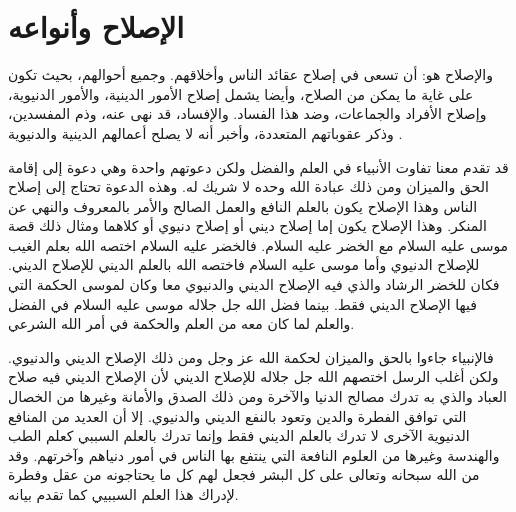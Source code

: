 

\section{الإصلاح وأنواعه}

والإصلاح هو: أن تسعى في إصلاح عقائد الناس وأخلاقهم. وجميع أحوالهم، بحيث تكون على غاية ما يمكن من الصلاح، وأيضا يشمل إصلاح الأمور الدينية، والأمور الدنيوية، وإصلاح الأفراد والجماعات، وضد هذا الفساد. والإفساد، قد نهى عنه، وذم المفسدين، وذكر عقوباتهم المتعددة، وأخبر أنه لا يصلح أعمالهم الدينية والدنيوية \href{https://shamela.ws/book/42/2142#p13}{\faExternalLink} \cite{tafsir_Saadi}.

قد تقدم معنا تفاوت الأنبياء في العلم والفضل ولكن دعوتهم واحدة وهي دعوة إلى إقامة الحق والميزان ومن ذلك عبادة الله وحده لا شريك له. وهذه الدعوة تحتاج إلى إصلاح الناس وهذا الإصلاح يكون بالعلم النافع والعمل الصالح والأمر بالمعروف والنهي عن المنكر. وهذا الإصلاح يكون إما إصلاح ديني أو إصلاح دنيوي أو كلاهما ومثال ذلك قصة موسى عليه السلام مع الخضر عليه السلام. فالخضر عليه السلام اختصه الله بعلم الغيب للإصلاح الدنيوي وأما موسى عليه السلام فاختصه الله بالعلم الديني للإصلاح الديني. فكان للخضر الرشاد والذي فيه الإصلاح الديني والدنيوي معا وكان لموسى الحكمة التي فيها الإصلاح الديني فقط. بينما فضل الله جل جلاله موسى عليه السلام في الفضل والعلم لما كان معه من العلم والحكمة في أمر الله الشرعي. 

فالإنبياء جاءوا بالحق والميزان لحكمة الله عز وجل ومن ذلك الإصلاح الديني والدنيوي. ولكن أغلب الرسل اختصهم الله جل جلاله للإصلاح الديني لأن الإصلاح الديني فيه صلاح العباد والذي به تدرك مصالح الدنيا والآخرة ومن ذلك الصدق والأمانة وغيرها من الخصال التي توافق الفطرة والدين وتعود بالنفع الديني والدنيوي. إلا أن العديد من المنافع الدنيوية الآخرى لا تدرك بالعلم الديني فقط وإنما تدرك بالعلم السببي كعلم الطب والهندسة وغيرها من العلوم النافعة التي ينتفع بها الناس في أمور دنياهم وآخرتهم. وقد من الله سبحانه وتعالى على كل البشر فجعل لهم كل ما يحتاجونه من عقل وفطرة لإدراك هذا العلم السببيي كما تقدم بيانه. 

